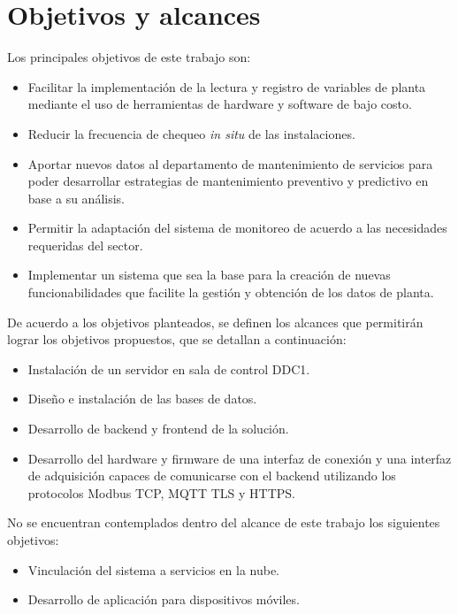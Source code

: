 
\section{Objetivos y alcances}

Los principales objetivos de este trabajo son:\\ 


\begin{itemize}
	\item Facilitar la implementación de la lectura y registro de variables de planta mediante el uso de herramientas de hardware y software de bajo costo. 
	\item Reducir la frecuencia de chequeo \textit{in situ} de las instalaciones.
	\item Aportar nuevos datos al departamento de mantenimiento de servicios para poder desarrollar estrategias de mantenimiento preventivo y predictivo en base a su análisis.
	\item Permitir la adaptación del sistema de monitoreo de acuerdo a las necesidades requeridas del sector.
	\item Implementar un sistema que sea la base para la creación de nuevas funcionabilidades que facilite la gestión y obtención de los datos de planta. \\ 
\end{itemize}

De acuerdo a los objetivos planteados, se definen los alcances que permitirán lograr los objetivos propuestos, que se detallan a continuación:\\ 

\begin{itemize}
 
	\item Instalación de un servidor en sala de control DDC1.
	\item Diseño e instalación de las bases de datos.
	\item Desarrollo de backend y frontend de la solución.
	\item Desarrollo del hardware y firmware de una interfaz de conexión y una interfaz de adquisición capaces de comunicarse con el backend utilizando los protocolos Modbus TCP, MQTT TLS y HTTPS.\\ 
	
\end{itemize}

No se encuentran contemplados dentro del alcance de este trabajo los siguientes objetivos:\\ 

\begin{itemize}
	\item Vinculación del sistema a servicios en la nube.
	\item Desarrollo de aplicación para dispositivos móviles.
\end{itemize}


